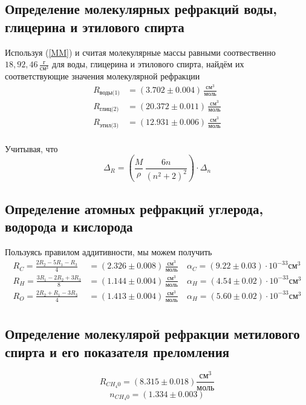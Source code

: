 \documentclass[12pt]{article}
\begin{document}
\subsection*{Определение молекулярных рефракций воды, глицерина и этилового спирта}
\par
	Используя (\ref{MM}) и считая молекулярные массы равными соотвественно $ 18, 92, 46 \, \frac{\text{г}}{\text{см}^3} $ для воды, глицерина и этилового спирта, найдём их соответствующие значения молекулярной рефракции
	\begin{align*}
		R_\text{воды(1)} &= (3.702 \pm 0.004) \, \frac{\text{см}^3}{\text{моль}} \\
		R_\text{глиц(2)} &= (20.372 \pm 0.011) \, \frac{\text{см}^3}{\text{моль}}\\
		R_\text{этил(3)} &= (12.931 \pm 0.006) \, \frac{\text{см}^3}{\text{моль}}\\
	\end{align*}
\par
	Учитывая, что
\[
	\Delta_R = \left( \frac{M}{\rho} \, \frac{6n}{(n^2 + 2)^2} \right) \cdot \Delta_n
\]

\subsection*{Определение атомных рефракций углерода, водорода и кислорода}
\par
	Пользуясь правилом аддитивности, мы можем получить
\begin{align*}
	R_C = \frac{2R_2 - 5R_1 - R_3}{4} &= \left(2.326 \pm 0.008\right) \, \frac{\text{см}^3}{\text{моль}} \quad \alpha_C = \left(9.22 \pm 0.03 \right) \cdot 10^{-33} \text{см}^3 \\
	R_H = \frac{3R_1 - 2R_2 + 3R_3}{8} &= \left(1.144 \pm 0.004\right) \, \frac{\text{см}^3}{\text{моль}} \quad \alpha_H = \left(4.54 \pm 0.02 \right) \cdot 10^{-33} \text{см}^3 \\
	R_O = \frac{2R_2 + R_1 - 3R_3}{4} &= \left(1.413 \pm 0.004\right) \, \frac{\text{см}^3}{\text{моль}} \quad \alpha_H = \left(5.60 \pm 0.02 \right) \cdot 10^{-33} \text{см}^3 \\
\end{align*}

\subsection*{Определение молекулярой рефракции метилового спирта и его показателя преломления}
\[
	R_\text{$C H_4 0$} = \left(8.315 \pm 0.018\right) \frac{\text{см}^3}{\text{моль}}
\]
\[
	n_\text{$C H_4 0$} = \left(1.334 \pm 0.003 \right)
\]
\end{document}
